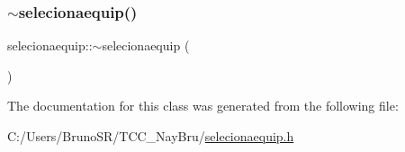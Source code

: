 \hypertarget{classselecionaequip_adabd9829153adf6adb64c75a79ac7964}{}\label{classselecionaequip_adabd9829153adf6adb64c75a79ac7964} 
\subsubsection{\texorpdfstring{$\sim$selecionaequip()}{~selecionaequip()}}
{\footnotesize\ttfamily selecionaequip\+::$\sim$selecionaequip (\begin{DoxyParamCaption}{ }\end{DoxyParamCaption})}



The documentation for this class was generated from the following file\+:\begin{DoxyCompactItemize}
\item 
C\+:/\+Users/\+Bruno\+S\+R/\+T\+C\+C\+\_\+\+Nay\+Bru/\hyperlink{selecionaequip_8h}{selecionaequip.\+h}\end{DoxyCompactItemize}
